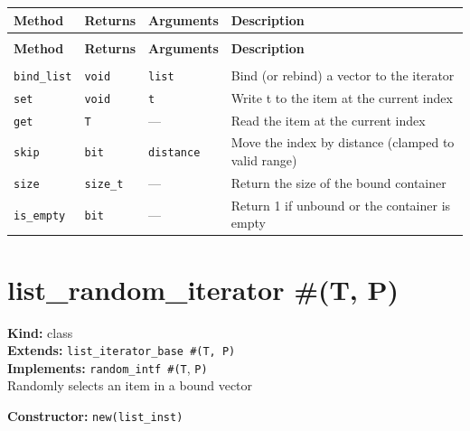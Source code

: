 \documentclass[11pt,letterpaper]{report}
\begin{document}
\begin{xltabular}{\linewidth}{>{\small}p{1.35in} >{\small}p{1.25in} >{\small}p{0.95in} >{\small}X}
\toprule
\textbf{Method} & \textbf{Returns} & \textbf{Arguments} & \textbf{Description} \\
\midrule
\endfirsthead
{} \\
\midrule
\textbf{Method} & \textbf{Returns} & \textbf{Arguments} & \textbf{Description} \\
\midrule
\endhead
\midrule
{} \\
\endfoot
\bottomrule
\endlastfoot
\texttt{bind\_list} & \texttt{void} & \texttt{list} & Bind (or rebind) a vector to the iterator \\
\texttt{set} & \texttt{void} & \texttt{t} & Write t to the item at the current index \\
\texttt{get} & \texttt{T} & --- & Read the item at the current index \\
\texttt{skip} & \texttt{bit} & \texttt{distance} & Move the index by distance (clamped to valid range) \\
\texttt{size} & \texttt{size\_t} & --- & Return the size of the bound container \\
\texttt{is\_empty} & \texttt{bit} & --- & Return 1 if unbound or the container is empty \\
\end{xltabular}

\section{list\_random\_iterator \#(T, P)}
\label{cls:listrandomiteratorTP}

\noindent\textbf{Kind:} class\\
\noindent\textbf{Extends:} \texttt{list\_iterator\_base \#(T, P)}\\
\noindent\textbf{Implements:} \texttt{random\_intf \#(T}, \texttt{P)}\\
\noindent Randomly selects an item in a bound vector

\noindent\textbf{Constructor:} \texttt{new(list\_inst)}
\end{document}
